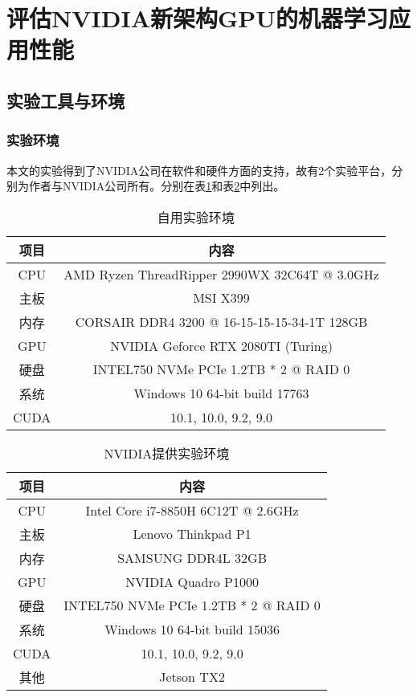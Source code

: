 \section{评估NVIDIA新架构GPU的机器学习应用性能}
\subsection{实验工具与环境}
\subsubsection{实验环境}
\par 本文的实验得到了NVIDIA公司在软件和硬件方面的支持，故有2个实验平台，分别为作者与NVIDIA公司所有。分别在表\ref{table-自用环境}和表\ref{table-公司环境}中列出。\\
\begin{table}
	\centering
	\caption{自用实验环境}
	\begin{tabular}{cc}
		\toprule
		项目	&	内容\\
		\midrule
		CPU		&	AMD Ryzen ThreadRipper 2990WX 32C64T @ 3.0GHz\\
		主板		&	MSI X399\\
		内存		&	CORSAIR DDR4 3200 @ 16-15-15-15-34-1T 128GB\\
		GPU		&	NVIDIA Geforce RTX 2080TI (Turing)\\
		硬盘		&	INTEL750 NVMe PCIe 1.2TB * 2 @ RAID 0\\
		系统		&	Windows 10 64-bit build 17763\\	
		CUDA	&	10.1, 10.0, 9.2, 9.0\\
		\bottomrule
	\end{tabular} \label{table-自用环境}
\end{table}
\begin{table}
	\centering
	\caption{NVIDIA提供实验环境}
	\begin{tabular}{cc}
		\toprule
		项目	&	内容\\
		\midrule
		CPU		&	Intel Core i7-8850H 6C12T @ 2.6GHz\\
		主板		&	Lenovo Thinkpad P1\\
		内存		&	SAMSUNG DDR4L 32GB\\
		GPU		&	NVIDIA Quadro P1000\\
		硬盘		&	INTEL750 NVMe PCIe 1.2TB * 2 @ RAID 0\\
		系统		&	Windows 10 64-bit build 15036\\	
		CUDA	&	10.1, 10.0, 9.2, 9.0\\
		其他		&	Jetson TX2\\
		\bottomrule
	\end{tabular} \label{table-公司环境} 
\end{table}
